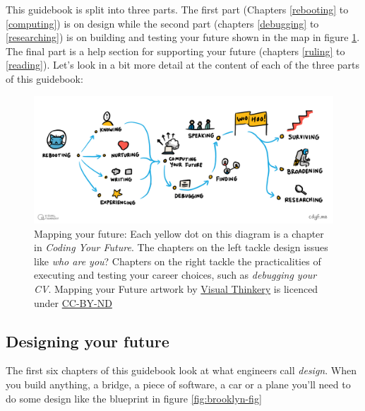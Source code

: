 \documentclass[
]{book}
\begin{document}
This guidebook is split into three parts. The first part (Chapters \ref{rebooting} to \ref{computing}) is on design while the second part (chapters \ref{debugging} to \ref{researching}) is on building and testing your future shown in the map in figure \ref{fig:map-fig}. The final part is a help section for supporting your future (chapters \ref{ruling} to \ref{reading}). Let's look in a bit more detail at the content of each of the three parts of this guidebook:

\begin{figure}

{\centering \includegraphics[width=1\linewidth]{images/Course Map V3} 

}

\caption{Mapping your future: Each yellow dot on this diagram is a chapter in \emph{Coding Your Future}. The chapters on the left tackle design issues like \emph{who are you}? Chapters on the right tackle the practicalities of executing and testing your career choices, such as \emph{debugging your CV}. Mapping your Future artwork by \href{https://visualthinkery.com/}{Visual Thinkery} is licenced under \href{https://creativecommons.org/licenses/by-nd/4.0/}{CC-BY-ND}}\label{fig:map-fig}
\end{figure}



\hypertarget{parti}{%
\subsection{Designing your future}\label{parti}}

The first six chapters of this guidebook look at what engineers call \emph{design}. When you build anything, a bridge, a piece of software, a car or a plane you'll need to do some design like the blueprint in figure \ref{fig:brooklyn-fig}
\end{document}
